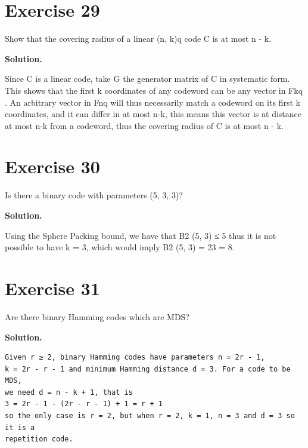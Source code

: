 \documentclass[11pt]{article}
\begin{document}
\section*{Exercise 29}
\begin{exercisebox}
Show that the covering radius of a linear (n, k)q code C is at most n - k.

\end{exercisebox}
\begin{solutionbox}
\textbf{Solution.}

Since C is a linear code, take G the generator matrix of C in systematic form. This shows that the first k coordinates of any codeword can be any vector in Fkq . An arbitrary vector in Fnq will thus necessarily match a codeword on its first k coordinates, and it can differ in at most n-k, this means this vector is at distance at most n-k from a codeword, thus the covering radius of C is at most n - k.

\end{solutionbox}
\section*{Exercise 30}
\begin{exercisebox}
Is there a binary code with parameters (5, 3, 3)?

\end{exercisebox}
\begin{solutionbox}
\textbf{Solution.}

Using the Sphere Packing bound, we have that B2 (5, 3) ≤ 5 thus it is not possible to have k = 3, which would imply B2 (5, 3) = 23 = 8.

\end{solutionbox}
\section*{Exercise 31}
\begin{exercisebox}
Are there binary Hamming codes which are MDS?

\end{exercisebox}
\begin{solutionbox}
\textbf{Solution.}

\begin{Verbatim}[fontsize=\small]
Given r ≥ 2, binary Hamming codes have parameters n = 2r - 1,
k = 2r - r - 1 and minimum Hamming distance d = 3. For a code to be MDS,
we need d = n - k + 1, that is
3 = 2r - 1 - (2r - r - 1) + 1 = r + 1
so the only case is r = 2, but when r = 2, k = 1, n = 3 and d = 3 so it is a
repetition code.
\end{Verbatim}
\end{solutionbox}
\end{document}
